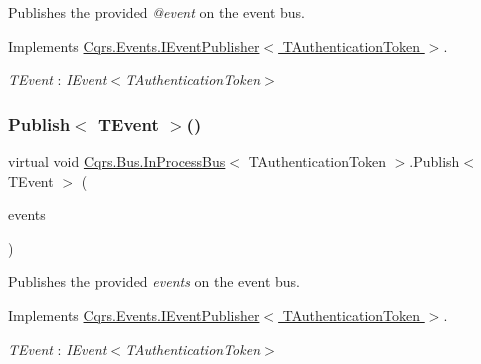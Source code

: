Publishes the provided {\itshape @event}  on the event bus. 



Implements \hyperlink{interfaceCqrs_1_1Events_1_1IEventPublisher_a02f0db0bc9b3aa1c7f766f58f8422ee3}{Cqrs.\+Events.\+I\+Event\+Publisher$<$ T\+Authentication\+Token $>$}.

\begin{Desc}
\item[Type Constraints]\begin{description}
\item[{\em T\+Event} : {\em I\+Event$<$T\+Authentication\+Token$>$}]\end{description}
\end{Desc}
\mbox{\label{classCqrs_1_1Bus_1_1InProcessBus_ae154f274db2a028a6094677d83cc1c74}} 
\subsubsection{\texorpdfstring{Publish$<$ T\+Event $>$()}{Publish< TEvent >()}\hspace{0.1cm}{\footnotesize\ttfamily [2/2]}}
{\footnotesize\ttfamily virtual void \hyperlink{classCqrs_1_1Bus_1_1InProcessBus}{Cqrs.\+Bus.\+In\+Process\+Bus}$<$ T\+Authentication\+Token $>$.Publish$<$ T\+Event $>$ (\begin{DoxyParamCaption}\item[{I\+Enumerable$<$ T\+Event $>$}]{events }\end{DoxyParamCaption})\hspace{0.3cm}{\ttfamily [virtual]}}



Publishes the provided {\itshape events}  on the event bus. 



Implements \hyperlink{interfaceCqrs_1_1Events_1_1IEventPublisher_a2cbcc3d2c24d015abef6337714ec51ff}{Cqrs.\+Events.\+I\+Event\+Publisher$<$ T\+Authentication\+Token $>$}.

\begin{Desc}
\item[Type Constraints]\begin{description}
\item[{\em T\+Event} : {\em I\+Event$<$T\+Authentication\+Token$>$}]\end{description}
\end{Desc}
\mbox{\label{classCqrs_1_1Bus_1_1InProcessBus_a38c0684e313f42bfb36b40703db94ccb}} 
